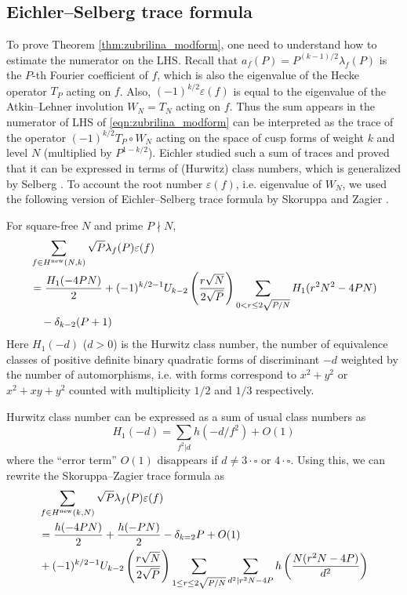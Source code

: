 \subsection{Eichler--Selberg trace formula}

To prove Theorem \ref{thm:zubrilina_modform}, one need to understand how to estimate the numerator on the LHS.
Recall that $a_f(P) = P^{(k-1)/2} \lambda_f(P)$ is the $P$-th Fourier coefficient of $f$, which is also the eigenvalue of the Hecke operator $T_P$ acting on $f$.
Also, $(-1)^{k/2}\varepsilon(f)$ is equal to the eigenvalue of the Atkin--Lehner involution $W_N = T_N$ acting on $f$.
Thus the sum appears in the numerator of LHS of \eqref{eqn:zubrilina_modform} can be interpreted as the trace of the operator $(-1)^{k/2} T_P \circ W_N$ acting on the space of cusp forms of weight $k$ and level $N$ (multiplied by $P^{1 - k/2}$).
Eichler \cite{eichler1955class} studied such a sum of traces and proved that it can be expressed in terms of (Hurwitz) class numbers, which is generalized by Selberg \cite{selberg1956harmonic}.
To account the root number $\varepsilon(f)$, i.e. eigenvalue of $W_N$, we used the following version of Eichler--Selberg trace formula by Skoruppa and Zagier \cite{skoruppa1987jacobi}.

\begin{theorem}
    \label{thm:sz_tf}
    For square-free $N$ and prime $P \nmid N$,
    \begin{align*}
        &\sum_{f \in H^{\mathrm{new}}(N, k)} \sqrt{P} \lambda_f(P) \varepsilon(f)\nonumber \\
        &= \frac{H_1(-4PN)}{2} + (-1)^{k/2 - 1} U_{k - 2} \left(\frac{r\sqrt{N}}{2\sqrt{P}}\right) \sum_{0 < r \le 2\sqrt{P/N}} H_1(r^2 N^2 - 4PN) \\
        &\quad - \delta_{k-2}(P+1)
    \end{align*}
    Here $H_1(-d)$ ($d > 0$) is the Hurwitz class number, the number of equivalence classes of positive definite binary quadratic forms of discriminant $-d$ weighted by the number of automorphisms, i.e. with forms correspond to $x^2 + y^2$ or $x^2 + xy + y^2$ counted with multiplicity $1/2$ and $1/3$ respectively.
\end{theorem}

Hurwitz class number can be expressed as a sum of usual class numbers as
\[
H_1(-d) = \sum_{f^2 | d} h(-d / f^2) + O(1)
\]
where the ``error term'' $O(1)$ disappears if $d \ne 3 \cdot \square$ or $4 \cdot \square$.
Using this, we can rewrite the Skoruppa--Zagier trace formula as
\begin{align*}
    &\sum_{f \in H^{\mathrm{new}}(k, N)} \sqrt{P} \lambda_f(P) \varepsilon(f) \\
    &= \frac{h(-4PN)}{2} + \frac{h(-PN)}{2} - \delta_{k=2} P + O(1) \\
    &+ (-1)^{k/2 - 1} U_{k-2} \left(\frac{r\sqrt{N}}{2\sqrt{P}}\right) \sum_{1 \le r \le 2\sqrt{P/N}} \sum_{d^2 | r^2 N - 4P} h\left(\frac{N(r^2 N - 4P)}{d^2}\right)
\end{align*}

